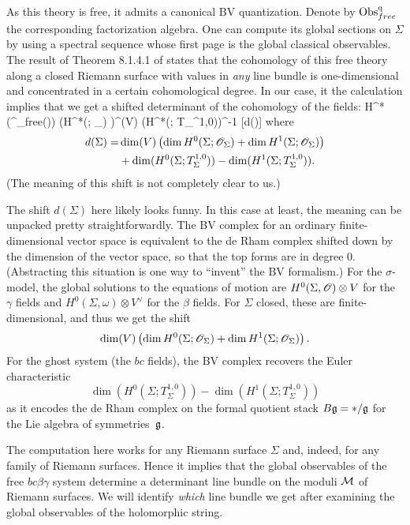As this theory is free, it admits a canonical BV quantization.
Denote by ${\rm Obs}^{{\rm q}}_{free}$ the corresponding factorization algebra.
One can compute its global sections on $\Sigma$ by using a spectral sequence whose first page is the global classical observables.
The result of Theorem 8.1.4.1 of \cite{CG1} states that the cohomology of this free theory along a closed Riemann surface with values in {\em any} line bundle is one-dimensional and concentrated in a certain cohomological degree. 
In our case, it the calculation implies that we get a shifted determinant of the cohomology of the fields:
\ben
H^*\left(\Obs^\q_{free}(\Sigma)\right) \cong \det \left(H^*(\Sigma ; \sO_\Sigma) \right)^{\tensor \dim(V)} \tensor \det \left(H^*(\Sigma ; T_\Sigma^{1,0})\right)^{-1} [d(\Sigma)] 
\een
where 
\begin{align*}
d(\Sigma) = & \dim (V)  \left(\dim H^0(\Sigma ; \mathscr O_\Sigma) + \dim H^1(\Sigma ; \mathscr O_\Sigma)\right) \\
&+ \dim(H^0(\Sigma ; T_\Sigma^{1,0})) - \dim(H^1(\Sigma ; T_\Sigma^{1,0})).
\end{align*}
(The meaning of this shift is not completely clear to us.)

\begin{rmk}
The shift $d(\Sigma)$ here likely looks funny.
In this case at least, the meaning can be unpacked pretty straightforwardly. 
The BV complex for an ordinary finite-dimensional vector space is equivalent to the de Rham complex shifted down by the dimension of the vector space, 
so that the top forms are in degree 0.
(Abstracting this situation is one way to ``invent'' the BV formalism.)
For the $\sigma$-model, the global solutions to the equations of motion are $H^0(\Sigma,\mathscr O) \otimes V$ for the $\gamma$ fields and $H^0(\Sigma,\omega) \otimes V^\vee$ for the $\beta$ fields.
For $\Sigma$ closed, these are finite-dimensional, and thus we get the shift
\[
 \dim (V)  \left(\dim H^0(\Sigma ; \mathscr O_\Sigma) + \dim H^1(\Sigma ; \mathscr O_\Sigma)\right).
\]
For the ghost system (the $bc$ fields), 
the BV complex recovers the Euler characteristic 
\[
\dim(H^0(\Sigma ; T_\Sigma^{1,0})) - \dim(H^1(\Sigma ; T_\Sigma^{1,0}))
\]
as it encodes the de Rham complex on the formal quotient stack $B\mathfrak g = \ast/\mathfrak g$ for the Lie algebra of symmetries~$\mathfrak g$.
\end{rmk}

The computation here works for any Riemann surface $\Sigma$ and, indeed, for any family of Riemann surfaces.
Hence it implies that the global observables of the free $bc\beta\gamma$ system determine a determinant line bundle on the moduli $\mathcal M$ of Riemann surfaces.
We will identify {\em which} line bundle we get after examining the global observables of the holomorphic string.

